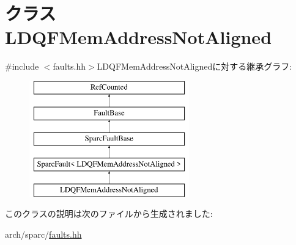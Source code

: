 \hypertarget{classSparcISA_1_1LDQFMemAddressNotAligned}{
\section{クラス LDQFMemAddressNotAligned}
\label{classSparcISA_1_1LDQFMemAddressNotAligned}
}


{\ttfamily \#include $<$faults.hh$>$}LDQFMemAddressNotAlignedに対する継承グラフ:\begin{figure}[H]
\begin{center}
\leavevmode
\includegraphics[height=5cm]{classSparcISA_1_1LDQFMemAddressNotAligned}
\end{center}
\end{figure}


このクラスの説明は次のファイルから生成されました:\begin{DoxyCompactItemize}
\item 
arch/sparc/\hyperlink{arch_2sparc_2faults_8hh}{faults.hh}\end{DoxyCompactItemize}
